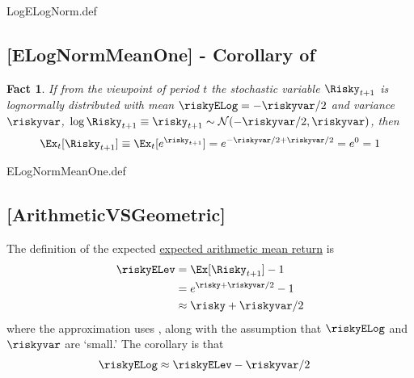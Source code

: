\documentclass{handout}
\newtheorem{Fact}{Fact}
\begin{document}
\begin{verbatimwrite}{LogELogNorm.def}
\providecommand{\LogELogNorm}{\href{https://www.econ2.jhu.edu/people/ccarroll/public/LectureNotes/MathFacts/MathFactsList\#LogELogNorm}{\ensuremath{\mathtt{[LogELogNorm]}}}}
\end{verbatimwrite}

\hypertarget{ELogNormMeanOne}{}
\subsection{[ELogNormMeanOne] - Corollary of \ELogNorm}

\begin{Fact} If from the viewpoint of period $t$ the stochastic variable $\Risky_{t+1}$ is lognormally distributed with mean $\riskyELog=-\riskyvar/2$ and variance $\riskyvar$, $\log \Risky_{t+1} \equiv \risky_{t+1} \sim \mathcal{N}(-\riskyvar/2,\riskyvar)$, then 
\begin{equation}
        \Ex_{t}[\Risky_{t+1}] \equiv \Ex_{t}[e^{\risky_{t+1}}] = e^{-\riskyvar/2+\riskyvar/2}=e^{0}=1 \label{eq:ELogNormMeanOne}
\end{equation}
\end{Fact}

\begin{verbatimwrite}{ELogNormMeanOne.def}
\providecommand{\ELogNormMeanOne}{\href{https://www.econ2.jhu.edu/people/ccarroll/public/LectureNotes/MathFacts/MathFactsList\#ELogNormMeanOne}{\ensuremath{\mathtt{[ELogNormMeanOne]}}}}
\end{verbatimwrite}

\hypertarget{ArithmeticVSGeometric}{}
\subsection{[ArithmeticVSGeometric]}

The definition of the expected \href{https://stats.stackexchange.com/questions/30365/why-is-expectation-the-same-as-the-arithmetic-mean}{expected arithmetic mean return} is 
\begin{equation}\begin{gathered}\begin{aligned} \label{eq:riskyELev}
      \riskyELev & = \Ex[\Risky_{t+1}]-1
\\ & = e^{\null{\risky}+\riskyvar/2} - 1
  \\ & \approx \risky+\riskyvar/2
    \end{aligned}\end{gathered}\end{equation}
where the approximation uses \ExpEps, along with the assumption that $\riskyELog$ and $\riskyvar$ are `small.'  The corollary is that 
\begin{equation}\begin{gathered}\begin{aligned} \label{eq:riskyELog}
 \riskyELog & \approx \riskyELev-\riskyvar/2 
\end{aligned}\end{gathered}\end{equation}
\end{document}
